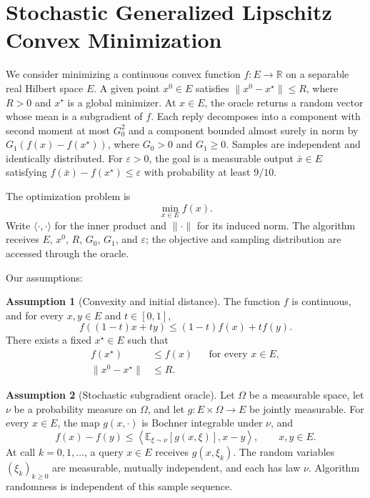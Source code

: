 \documentclass[10pt]{article}
\theoremstyle{definition}
\newtheorem{assumption}{Assumption}
\begin{document}
\section*{Stochastic Generalized Lipschitz Convex Minimization}
We consider minimizing a continuous convex function $f:E\to\mathbb{R}$ on a separable real Hilbert space $E$. A given point $x^0\in E$ satisfies $\|x^0-x^\star\|\leq R$, where $R>0$ and $x^\star$ is a global minimizer. At $x\in E$, the oracle returns a random vector whose mean is a subgradient of $f$. Each reply decomposes into a component with second moment at most $G_0^2$ and a component bounded almost surely in norm by $G_1(f(x)-f(x^\star))$, where $G_0>0$ and $G_1\geq0$. Samples are independent and identically distributed. For $\varepsilon>0$, the goal is a measurable output $\bar{x}\in E$ satisfying $f(\bar{x})-f(x^\star)\leq\varepsilon$ with probability at least $9/10$.

The optimization problem is
\[
\min_{x\in E} f(x).
\]
Write $\langle\cdot,\cdot\rangle$ for the inner product and $\|\cdot\|$ for its induced norm. The algorithm receives $E$, $x^0$, $R$, $G_0$, $G_1$, and $\varepsilon$; the objective and sampling distribution are accessed through the oracle.

Our assumptions:
\begin{assumption}[Convexity and initial distance]
The function $f$ is continuous, and for every $x,y\in E$ and $t\in[0,1]$,
\[
f((1-t)x+ty)\leq (1-t)f(x)+tf(y).
\]
There exists a fixed $x^\star\in E$ such that
\[
\begin{aligned}
f(x^\star)&\leq f(x) &&\text{for every }x\in E,\\
\|x^0-x^\star\|&\leq R.
\end{aligned}
\]
\end{assumption}

\begin{assumption}[Stochastic subgradient oracle]
Let $\Omega$ be a measurable space, let $\nu$ be a probability measure on $\Omega$, and let $g:E\times\Omega\to E$ be jointly measurable. For every $x\in E$, the map $g(x,\cdot)$ is Bochner integrable under $\nu$, and
\[
f(x)-f(y)\leq
\left\langle\mathbb{E}_{\xi\sim\nu}[g(x,\xi)],x-y\right\rangle,
\qquad x,y\in E.
\]
At call $k=0,1,\ldots$, a query $x\in E$ receives $g(x,\xi_k)$. The random variables $(\xi_k)_{k\geq0}$ are measurable, mutually independent, and each has law $\nu$. Algorithm randomness is independent of this sample sequence.
\end{assumption}
\end{document}
